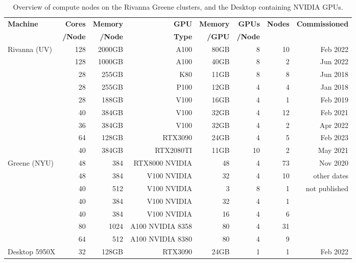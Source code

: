\documentclass[sigplan,screen]{acmart}
\begin{document}
\begin{table}[htb]
    \caption{Overview of compute nodes on the Rivanna Greene clusters, and the Desktop containing NVIDIA GPUs.}
    \label{tab:hwoverview}
    \begin{center}
    {\footnotesize
    \begin{tabular}{|l|r|r|r|r|r|r|r|}
        \hline
            {\bf Machine}  & {\bf Cores} & {\bf Memory} & {\bf GPU}   &   {\bf Memory} & {\bf GPUs} & {\bf Nodes}  & {\bf Commissioned} \\ 
                     &  {\bf /Node} & {\bf /Node}  &  {\bf Type}  & {\bf /GPU}     &   {\bf /Node}        & & \\
        \hline
        \hline
        Rivanna (UV)    & 128 & 2000GB   & A100 & 80GB &  8  & 10 & Feb 2022 \\
                        & 128 & 1000GB   & A100 & 40GB &  8  &  2 & Jun 2022 \\   
                        & 28  & 255GB    & K80  & 11GB &  8  &  8 & Jun 2018 \\
                        & 28  & 255GB    & P100 & 12GB &  4  &  4 & Jan 2018 \\
                        & 28  & 188GB    & V100 & 16GB &  4  &  1 & Feb 2019 \\
                        & 40  & 384GB    & V100 & 32GB &  4  & 12 & Feb 2021 \\
                        & 36  & 384GB    & V100 & 32GB &  4  &  2 & Apr 2022 \\
                        &  64 & 128GB     & RTX3090   & 24GB    & 4   &  5 & Feb 2023         \\
                        & 40  & 384GB    & RTX2080TI & 11GB & 10  &  2 & May 2021 \\
         \hline
         Greene (NYU)	& 48	& 384	& RTX8000 NVIDIA	& 48	& 4	& 73 & Nov 2020\\
	        & 48	& 384	& V100 NVIDIA	    & 32	& 4	& 10 & other dates \\
	        & 40	& 512	& V100 NVIDIA	    & 3     & 8 & 1  & not published \\
	        & 40	& 384	& V100 NVIDIA	    & 32    & 4	& 1  & \\
	        & 40	& 384	& V100 NVIDIA	    & 16    & 4	& 6  & \\
	        & 80	& 1024	& A100 NVIDIA 8358	& 80    & 4 & 31 & \\
	        & 64	& 512	& A100 NVIDIA 8380	& 80    & 4 & 9  & \\

         \hline
         Desktop 5950X     &  32 & 128GB     & RTX3090   & 24GB    & 1 & 1 & Feb 2022   \\
         \hline
    \end{tabular}
    }
    \end{center}

\end{table}
\end{document}
